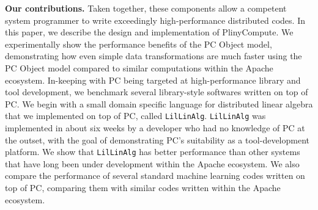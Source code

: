 \vspace{5 pt}
\noindent
\textbf{Our contributions.}
Taken together, these components allow a competent system programmer to write exceedingly high-performance distributed codes.
In this paper, we describe the design and implementation of PlinyCompute.  We experimentally show the performance benefits of the PC Object model, 
demonstrating how even simple data transformations are much faster using the PC Object model compared to similar computations within the 
Apache ecosystem.
In-keeping with PC being targeted at high-performance
library and tool development,
we benchmark several library-style softwares written on top of PC.  We begin with a small domain specific language
for distributed linear algebra that we implemented on top of PC, called \texttt{LilLinAlg}.  \texttt{LilLinAlg} was implemented in about six weeks by a developer
who had no knowledge of PC at the outset, with the goal of demonstrating PC's suitability as a tool-development platform.  
We show that \texttt{LilLinAlg} has better performance than other systems that have long been under development
within the Apache ecosystem.   
We also compare the performance of several standard machine learning codes written on top of PC, comparing them with similar
codes written within the Apache ecosystem.  

